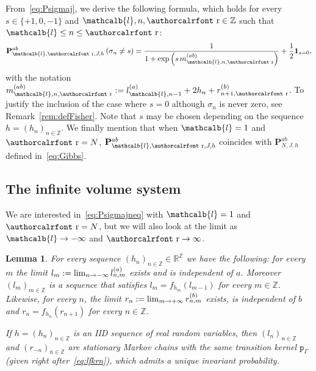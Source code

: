 \documentclass[10pt]{amsart}
\newtheorem{lemm}[theo]{Lemma}\newtheorem{prop}[theo]{Proposition}\newtheorem{coro}[theo]{Corollary}\newtheorem{conj}[theo]{Conjecture}
\theoremstyle{definition}\newtheorem{defi}[theo]{Definition}\newtheorem{rema}[theo]{Remark}\newtheorem{exam}[theo]{Example}\newtheorem{exem}[theo]{Example}\newtheorem{nota}[theo]{Notation}
\newcommand{\mathcalc}[1]{\text{\authorcalrfont #1}}
\newcommand{\ind}{\mathbf{1}}
\newcommand{\pp}{\mathtt{p}_\gG}
\newcommand{\bP}{\mathbf{P}}
\newcommand{\bbR}{\mathbb{R}}
\newcommand{\bbZ}{\mathbb{Z}}
\newcommand{\gG}{\Gamma}
\newcommand{\gs}{\sigma}
\renewcommand{\ell}{\mathcalb{l}}
\newcommand{\err}{\mathcalc{r}}
\renewcommand*{\to}{\mathchoice{\longrightarrow}{\rightarrow}{\rightarrow}{\rightarrow}}
\begin{document}
From~\eqref{eq:Psigmaj}, we derive the following formula, which holds for every $s\in\{+1, 0, -1\}$ and $\ell, n, \err \in \bbZ$ such that $\ell \le n \le \err$:
\begin{equation}\label{eq:Psigmajneq}
\bP_{ \ell, \err, J, h}^{ab}\left(\gs_n \neq s\right)=
\frac {1} {1+ \exp\left(s \, m^{(ab)}_{\ell, n, \err}\right)}+\frac12 \ind_{s=0},
\end{equation}
with the notation $m^{(ab)}_{\ell, n, \err}:=l^{(a)}_{\ell, n-1} + 2h_n+ r^{(b)}_{n+1, \err}$. To justify the inclusion of the case where $s=0$ although $\sigma_n$ is never zero, see Remark~\ref{rem:defFisher}. Note that $s$ may be chosen depending on the sequence $h=(h_n)_{n\in\bbZ}$. We finally mention that when $\ell=1$ and $\err=N$, $\bP_{ \ell, \err, J, h}^{ab}$ coincides with $\bP_{N, J, h}^{ab}$ defined in~\eqref{eq:Gibbs}.

\subsection{The infinite volume system}\label{sec:infinite_volume}

We are interested in~\eqref{eq:Psigmajneq} with $\ell=1$ and $\err=N$, but we will also look at the limit as $\ell\to -\infty$ and $\err\to \infty$.


\begin{lemm}\label{th:from-infty}
For every sequence $(h_n)_{n\in\bbZ}\in\bbR^\bbZ$ we have the following: for every $m$ the limit $l_m:= \lim_{n \to -\infty} l^{(a)}_{n, m}$ exists and is independent of $a$. Moreover $(l_m)_{m\in \bbZ}$ is a sequence that satisfies $l_{m}=f_{h_m}(l_{m-1})$ for every $m\in\bbZ$. Likewise, for every $n$, the limit $r_n:= \lim_{m \to +\infty} r^{(b)}_{n, m}$ exists, is independent of $b$ and $r_{n}=f_{h_n}(r_{n+1})$ for every $n\in\bbZ$.

If $h=(h_n)_{n \in \bbZ}$ is an IID sequence of real random variables, then $(l_n)_{n \in \bbZ}$ and $(r_{-n})_{n\in \bbZ}$ are stationary Markov chains with the same transition kernel $\pp$ (given right after~\eqref{eq:lfkrn}), which admits a unique invariant probability.
\end{lemm}
\end{document}
